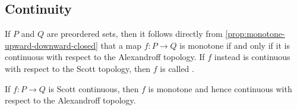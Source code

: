 








\subsection{Continuity}

If $P$ and $Q$ are preordered sets, then it follows directly from \cref{prop:monotone-upward-downward-closed} that a map $f \colon P \to Q$ is monotone if and only if it is continuous with respect to the Alexandroff topology. If $f$ instead is continuous with respect to the Scott topology, then $f$ is called .

\begin{lemma}
    \label{lem:Scott-continuous-monotone}
    If $f \colon P \to Q$ is Scott continuous, then $f$ is monotone and hence continuous with respect to the Alexandroff topology.
\end{lemma}

